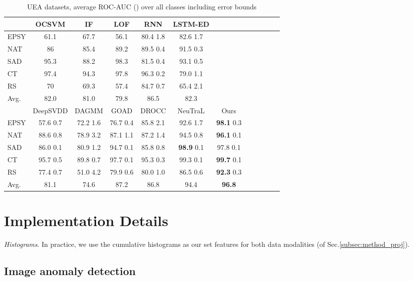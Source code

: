 \documentclass{article}
\begin{document}
\begin{table*}[h]
\caption{UEA datasets, average ROC-AUC  () over all classes including error bounds}
\centering
\small
\begin{tabular}{lccccccccccc}
\toprule

	&	OCSVM	&	IF	&	LOF	&	RNN			&	LSTM-ED			\\ \midrule						
EPSY	&	61.1	&	67.7	&	56.1	&	80.4		1.8	&	82.6		1.7	\\						
NAT	&	86	&	85.4	&	89.2	&	89.5		0.4	&	91.5		0.3	\\						
SAD	&	95.3	&	88.2	&	98.3	&	81.5		0.4	&	93.1		0.5	\\						
CT	&	97.4	&	94.3	&	97.8	&	96.3		0.2	&	79.0		1.1	\\						
RS	&	70	&	69.3	&	57.4	&	84.7		0.7	&	65.4		2.1	\\ \midrule						
Avg.	&	82.0	&	81.0	&	79.8	&	86.5			&	82.3			\\ \midrule						
	&	DeepSVDD	& DAGMM	&			GOAD			&	DROCC			&	NeuTraL			&	Ours			\\ \midrule
EPSY	&	57.6	 0.7	 & 72.2  1.6	 &	76.7		0.4	&	85.8		2.1	&	92.6		1.7	&	\textbf{98.1}		0.3	\\
NAT	&	88.6		0.8	& 78.9  3.2 &	87.1		1.1	&	87.2		1.4	&	94.5		0.8	&	\textbf{96.1}		0.1	\\
SAD	&	86.0		0.1	&  80.9  1.2 & 	94.7		0.1	&	85.8		0.8	&	\textbf{98.9}		0.1	&	97.8		0.1	\\
CT	&	95.7		0.5 & 89.8  0.7	&	97.7		0.1	&	95.3		0.3	&	99.3		0.1	&	\textbf{99.7}		0.1	\\
RS	&	77.4		0.7	& 51.0  4.2	& 79.9		0.6	&	80.0		1.0	&	86.5		0.6	& \textbf{92.3}		0.3	\\ \midrule	
Avg.	&	81.1			& 74.6	& 87.2			&	86.8			&	94.4			&	\textbf{96.8	}		\\

\bottomrule
\end{tabular}
\label{tab:realworld_errorbounds}
\end{table*}



\section{Implementation Details}
\label{app:imp}

\textit{Histograms}. In practice, we use the cumulative histograms as our set features for both data modalities (of Sec.\ref{subsec:method_proj}).

\subsection{Image anomaly detection}
\label{app:imp_image}
\end{document}
